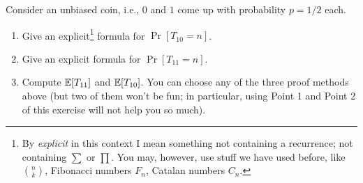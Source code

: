 \documentclass[12pt,a4]{article}
\begin{document}
\begin{exercise}
   Consider an unbiased coin, i.e., $0$ and $1$ come up with probability $p=1/2$ each.
   \begin{enumerate}
        \item Give an explicit\footnote{By {\em explicit} in this context I mean something
        not containing a recurrence; not containing $\sum$ or $\prod$. You may, however,
        use stuff we have used before, like ${n \choose k}$, Fibonacci numbers $F_n$,
        Catalan numbers $C_n$.}
         formula for $\Pr[T_{10} = n]$.
        \item Give an explicit formula for $\Pr[T_{11} = n]$. 
       \item  Compute $\mathbb{E}[T_{11}]$ and $\mathbb{E}[T_{10}]$. You can choose any of the three proof methods above (but 
   two of them won't be fun; in particular, using Point 1 and Point 2 of this exercise will not help you so much).
   \end{enumerate} 
\end{exercise}
\end{document}
